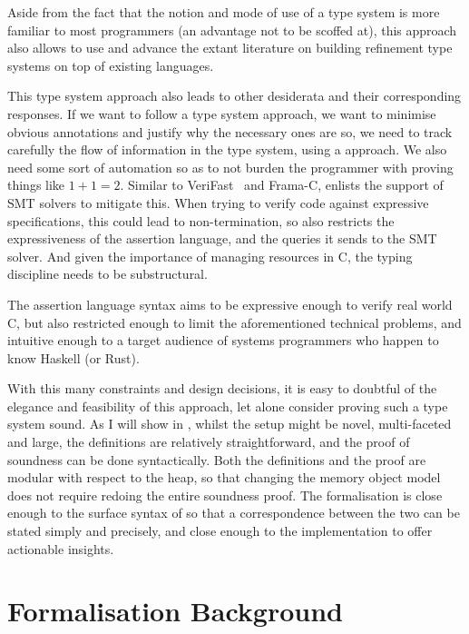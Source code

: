Aside from the fact that the notion and mode of use of a type system is more
familiar to most programmers (an advantage not to be scoffed at), this approach
also allows  to use and advance the extant literature on building
refinement type systems on top of existing languages.

This type system approach also leads to other desiderata and their
corresponding responses. If we want to follow a type system approach, we want
to minimise obvious annotations and justify why the necessary ones are so, we
need to track carefully the flow of information in the type system, using a
 approach. We also need some sort of automation so as to not
burden the programmer with proving things like $1 + 1 = 2$. Similar to
VeriFast~ and Frama-C,
 enlists the support of SMT solvers to mitigate this. When trying to
verify code against expressive specifications, this could lead to
non-termination, so  also restricts the expressiveness of the assertion
language, and the queries it sends to the SMT solver. And given the importance
of managing resources in C, the typing discipline needs to be substructural.

The  assertion language syntax aims to be expressive enough to verify
real world C, but also restricted enough to limit the aforementioned technical
problems, and intuitive enough to a target audience of systems programmers who
happen to know Haskell (or Rust).

With this many constraints and design decisions, it is easy to doubtful of the
elegance and feasibility of this approach, let alone consider proving such a
type system sound. As I will show in , whilst the setup
might be novel, multi-faceted and large, the definitions are relatively
straightforward, and the proof of soundness can be done syntactically. Both the
definitions and the proof are modular with respect to the heap, so that
changing the memory object model does not require redoing the entire soundness
proof. The formalisation is close enough to the surface syntax of  so
that a correspondence between the two can be stated simply and precisely, and
close enough to the implementation to offer actionable insights.

\chapter{Formalisation Background}%
\label{chap:formal-background}

